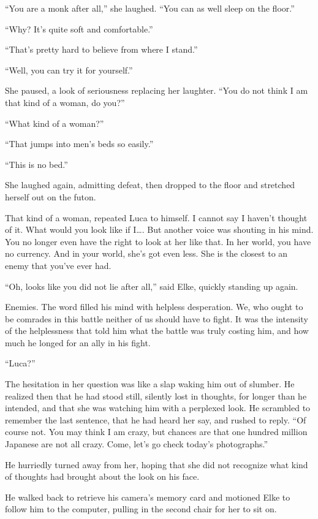 ``You are a monk after all,'' she laughed. ``You can as well sleep on the floor.''

``Why? It's quite soft and comfortable.''

``That's pretty hard to believe from where I stand.''

``Well, you can try it for yourself.''

She paused, a look of seriousness replacing her laughter. ``You do not think I am that kind of a woman, do you?''

``What kind of a woman?''

``That jumps into men's beds so easily.''

``This is no bed.''

She laughed again, admitting defeat, then dropped to the floor and stretched herself out on the futon.

That kind of a woman, repeated Luca to himself. I cannot say I haven't thought of it. What would you look like if I\ldots. But another voice was shouting in his mind. You no longer even have the right to look at her like that. In her world, you have no currency. And in your world, she's got even less. She is the closest to an enemy that you've ever had.

``Oh, looks like you did not lie after all,'' said Elke, quickly standing up again.

Enemies. The word filled his mind with helpless desperation. We, who ought to be comrades in this battle neither of us should have to fight. It was the intensity of the helplessness that told him what the battle was truly costing him, and how much he longed for an ally in his fight.

``Luca?''

The hesitation in her question was like a slap waking him out of slumber. He realized then that he had stood still, silently lost in thoughts, for longer than he intended, and that she was watching him with a perplexed look. He scrambled to remember the last sentence, that he had heard her say, and rushed to reply. ``Of course not. You may think I am crazy, but chances are that one hundred million Japanese are not all crazy. Come, let's go check today's photographs.''

He hurriedly turned away from her, hoping that she did not recognize what kind of thoughts had brought about the look on his face.

He walked back to retrieve his camera's memory card and motioned Elke to follow him to the computer, pulling in the second chair for her to sit on.

